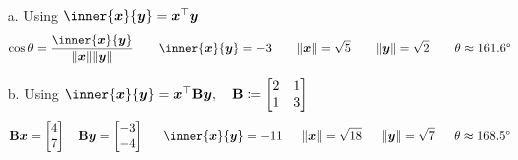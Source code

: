 \documentclass[11pt]{article}
\begin{document}
\begin{enumerate}
          \begin{enumerate}
              \item[a.] Using $\inner{\x}{\y} = \x^\top \y$
                    \[
                        \cos \theta
                        = \frac{ \inner{\x}{\y} }{ \norm{\x} \norm{\y} }
                        \qquad
                        \inner{\x}{\y} = -3
                        \qquad
                        \norm{\x} = \sqrt{5}
                        \qquad
                        \norm{\y} = \sqrt{2}
                        \qquad
                        \theta \approx 161.6\degree
                    \]

              \item[b.] Using $\inner{\x}{\y} = \x^\top \mat{B} \y, \quad \mat{B} \coloneq
                        \begin{bmatrix}
                            2 & 1 \\
                            1 & 3 \\
                        \end{bmatrix}
                    $
                    \[
                        \mat{B} \x =
                        \begin{bmatrix}
                            4 \\ 7
                        \end{bmatrix}
                        \quad
                        \mat{B} \y =
                        \begin{bmatrix}
                            -3 \\ -4
                        \end{bmatrix}
                        \quad \;\;
                        \inner{\x}{\y} = -11
                        \quad \;\;
                        \norm{\x} = \sqrt{18}
                        \quad \;\;
                        \norm{\y} = \sqrt{7}
                        \quad \;\;
                        \theta \approx 168.5\degree
                    \]
          \end{enumerate}


\end{enumerate}
\end{document}
